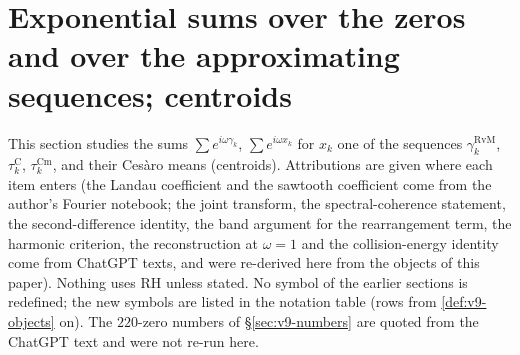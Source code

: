 \documentclass[11pt,a4paper]{article}
\numberwithin{equation}{section}
\theoremstyle{definition}
\theoremstyle{remark}
\newcommand{\Cm}{\mathrm{Cm}}
\begin{document}
\section{Exponential sums over the zeros and over the approximating sequences; centroids}\label{sec:v9-centroid}
This section studies the sums $\sum e^{i\omega\gamma_k}$, $\sum e^{i\omega x_k}$ for $x_k$ one of the sequences $\gamma_k^{\mathrm{RvM}}$, $\tau_k^{\mathrm C}$, $\tau_k^{\Cm}$, and their Ces\`aro means (centroids). Attributions are given where each item enters (the Landau coefficient and the sawtooth coefficient come from the author's Fourier notebook; the joint transform, the spectral-coherence statement, the second-difference identity, the band argument for the rearrangement term, the harmonic criterion, the reconstruction at $\omega=1$ and the collision-energy identity come from ChatGPT texts, and were re-derived here from the objects of this paper). Nothing uses RH unless stated. No symbol of the earlier sections is redefined; the new symbols are listed in the notation table (rows from \cref{def:v9-objects} on). The $220$-zero numbers of \S\ref{sec:v9-numbers} are quoted from the ChatGPT text and were not re-run here.
\end{document}
